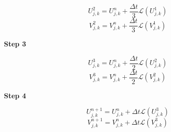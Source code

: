 \documentclass[]{article}
\begin{document}
\begin{equation}
	U^{2}_{j,k} = U^{n}_{j,k} + \frac{\Delta t}{3} \mathcal{L}(U^{1}_{j,k})
\end{equation}
\begin{equation}
	V^{2}_{j,k} = V^{n}_{j,k} + \frac{\Delta t}{3} \mathcal{L}(V^{1}_{j,k})
\end{equation}

\begin{center}
	\textbf{Step 3}
\end{center}

\begin{equation}
	U^{3}_{j,k} = U^{n}_{j,k} + \frac{\Delta t}{2} \mathcal{L}(U^{2}_{j,k})
\end{equation}
\begin{equation}
	V^{3}_{j,k} = V^{n}_{j,k} + \frac{\Delta t}{2} \mathcal{L}(V^{2}_{j,k})
\end{equation}

\begin{center}
	\textbf{Step 4}
\end{center}

\begin{equation}
	U^{n+1}_{j,k} = U^{n}_{j,k} + \Delta t \mathcal{L}(U^{3}_{j,k})
\end{equation}
\begin{equation}
	V^{n+1}_{j,k} = V^{n}_{j,k} + \Delta t \mathcal{L}(V^{3}_{j,k})
\end{equation}
\end{document}
